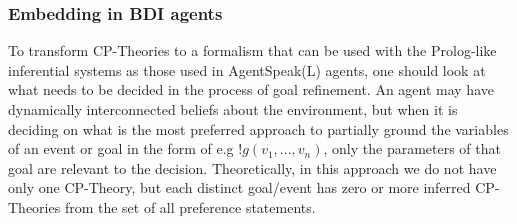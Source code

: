 

\subsubsection{Embedding in BDI agents}
\label{sssec:transform}
To transform CP-Theories to a formalism that can be used with the Prolog-like inferential systems as those used in AgentSpeak(L) agents, one should look at what needs to be decided in the process of goal refinement. An agent may have dynamically interconnected beliefs about the environment, but when it is deciding on what is the most preferred approach to partially ground the variables of an event or goal in the form of e.g $!g(v_1,...,v_n)$, only the parameters of that goal are relevant to %
the decision. Theoretically, in this approach we do not have only one CP-Theory, but each distinct goal/event has zero or more inferred CP-Theories from the set of all preference statements. 

